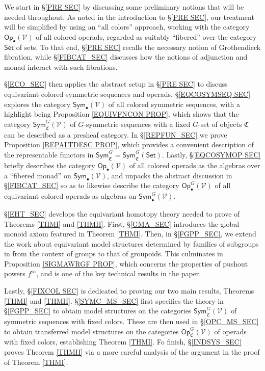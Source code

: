 \documentclass[a4paper,10pt
,draft
]{article}%
\numberwithin{equation}{section}
\numberwithin{figure}{section}
\theoremstyle{definition} %
\newcommand{\Op}{\mathsf{Op}}%
\newcommand{\V}{\ensuremath{\mathcal V}}
\newcommand{\1}{\ensuremath{\mathbbm 1}}%
\begin{document}
We start in \S \ref{PRE SEC} by discussing some preliminary notions that will be needed throughout.
As noted in the introduction to 
\S \ref{PRE SEC}, our treatment will be simplified by 
using an ``all colors'' approach,
working with the category $\Op_\bullet(\V)$ of all colored operads,
regarded as suitably ``fibered'' over the category $\mathsf{Set}$
of sets.
To that end, 
\S \ref{PRE SEC} recalls the necessary
notion of Grothendieck fibration, 
while \S \ref{FIBCAT_SEC}
discusses how the notions of adjunction and monad 
interact with such fibrations.

\S \ref{ECO_SEC} then applies the abstract setup in \S \ref{PRE SEC}
to discuss equivariant colored symmetric sequences and operads. 
\S \ref{EQCOSYMSEQ SEC}
explores the category
$\mathsf{Sym}_{\bullet}(\V)$
of all colored symmetric sequences,
with a highlight being
Proposition \ref{EQUIVFNCON PROP},
which shows that the category
$\mathsf{Sym}^G_{\mathfrak{C}}(\V)$
of $G$-symmetric sequences with a fixed $G$-set of objects
$\mathfrak{C}$ can be described as a presheaf category.
In \S \ref{REPFUN_SEC} we prove
Proposition \ref{REPALTDESC PROP},
which provides a convenient description of the representable functors in 
$\mathsf{Sym}^G_{\mathfrak{C}} = \mathsf{Sym}^G_{\mathfrak{C}}(\mathsf{Set})$.
%
Lastly, \S \ref{EQCOSYMOP SEC}
briefly describes the category 
$\mathsf{Op}_{\bullet}(\V)$ 
of all colored operads as the algebras over a ``fibered monad''
on  
$\mathsf{Sym}_{\bullet}(\V)$,
and unpacks the abstract discussion in \S \ref{FIBCAT_SEC}
so as to likewise describe the category 
$\mathsf{Op}_{\bullet}^G(\V)$ 
of all equivariant colored operads
as algebras on 
$\mathsf{Sym}^G_{\bullet}(\V)$.


\S \ref{EHT_SEC} develops the equivariant homotopy theory
needed to prove of Theorems \ref{THMI} and \ref{THMII}.
First, \S \ref{GMA_SEC} introduces the global monoid axiom featured in Theorem \ref{THMI}.
Then, in \S \ref{FGPP_SEC}, 
we extend %
the work 
about equivariant model structures determined by families of subgroups in \cite[\S 6]{BP_geo}
from the context of groups to that of groupoids.
This culminates in 
Proposition \ref{SIGMAWRGF PROP},
which concerns the properties of pushout powers $f^{\square n}$,
and is one of the key technical results in the paper. %


Lastly, \S \ref{FIXCOL SEC}
is dedicated to proving our two main results, 
Theorems \ref{THMI} and \ref{THMII}.
%
\S \ref{SYMC_MS_SEC} first specifies the theory in
\S \ref{FGPP_SEC}
to obtain model structures on the categories
$\mathsf{Sym}^G_{\mathfrak{C}}(\V)$ of symmetric sequences with fixed colors.
These are then used in \S \ref{OPC_MS_SEC}
to obtain transferred model structures on the 
categories
$\mathsf{Op}^G_{\mathfrak{C}}(\V)$
of operads with fixed colors, establishing Theorem \ref{THMI}.
Fo finish, \S \ref{INDSYS_SEC} proves Theorem \ref{THMII}
via a more careful analysis of the argument in the proof of 
Theorem \ref{THMI}.
\end{document}
